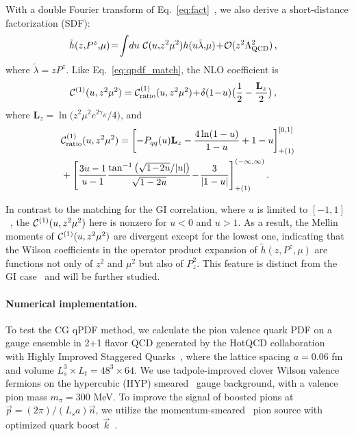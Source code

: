 \documentclass[prd,twocolumn,preprintnumbers,showpacs,nofootinbib,superscriptaddress,notitlepage,floatfix]{revtex4-1}
\DeclareRobustCommand{\eq}[1]{Eq.~\eqref{eq:#1}}
\DeclareRobustCommand{\eq}[1]{Eq.~(\ref{eq:#1})}
\newcommand{\nn}{\nonumber}
\begin{document}
With a double Fourier transform of \eq{fact}~\cite{Izubuchi:2018srq}, we also derive a short-distance factorization (SDF):
\begin{align}\label{eq:sdf}
	\tilde h(z,\!P^z,\!\mu) &\!=\! \int\! du\ {\cal C}(u,\!z^2\mu^2) h(u \tilde\lambda,\!\mu) \!+\! {\cal O}(z^2\Lambda_{\rm QCD}^2)\,,
\end{align}
where $\tilde\lambda = zP^z$. 
Like \eq{qpdf_match}, the NLO coefficient is
\begin{align}
	{\cal C}^{(1)}(u,z^2\mu^2) &= {\cal C}^{(1)}_{\rm ratio}(u,z^2\mu^2)  \!+\! \delta(1\!-\!u)\big({1\over2}-{\mathbf{L}_z\over2}\big)\,,
\end{align}
where $\mathbf{L}_z=\ln\big(z^2\mu^2e^{2\gamma_E}/ 4\big)$, and
\begin{align}
    &{\cal C}^{(1)}_{\rm ratio}(u,z^2\mu^2)    = \left[-P_{qq}(u)\mathbf{L}_z - {4\ln(1-u)\over 1-u} + 1-u\right]_{+(1)}^{[0,1]} \nn\\
    & + \Bigg[ {3 u-1\over u-1} \frac{\tan^{-1}\left(\sqrt{1\!-\!2 u}/|u|\right)}{\sqrt{1-2 u}} \!-\! {3\over |1-u|} \Bigg]_{+(1)}^{(-\infty, \infty)}\,.
\end{align}

In contrast to the matching for the GI correlation, where $u$ is limited to $[-1,1]$~\cite{Radyushkin:2017cyf,Ji:2017rah}, the ${\cal C}^{(1)}(u,z^2\mu^2)$ here is nonzero for $u<0$ and $u>1$. As a result, the Mellin moments of ${\cal C}^{(1)}(u,z^2\mu^2)$ are divergent except for the lowest one, indicating that the Wilson coefficients in the operator product expansion of $\tilde h(z,P^z,\mu)$ are functions not only of $z^2$ and $\mu^2$ but also of $P_z^2$. This feature is distinct from the GI case~\cite{Izubuchi:2018srq} and will be further studied.

\paragraph*{Numerical implementation.}
To test the CG qPDF method, we calculate the pion valence quark PDF on a gauge ensemble in 2+1 flavor QCD 
generated by the HotQCD collaboration~\cite{HotQCD:2014kol} with
Highly Improved Staggered Quarks~\cite{Follana:2006rc}, where the lattice spacing $a=0.06$ fm and volume $L_s^3\times L_t=48^3 \times 64$. We use tadpole-improved clover Wilson valence fermions 
on the hypercubic (HYP) smeared~\cite{Hasenfratz:2001hp} gauge background, with a valence pion mass $m_\pi=300$ MeV. To improve the signal of boosted pions at $\vec{p}=(2\pi)/(L_sa)\vec{n}$, we utilize the momentum-smeared~\cite{Bali:2016lva} pion source with optimized quark boost $\vec{k}$~\cite{Izubuchi:2019lyk,Gao:2020ito}.
\end{document}
